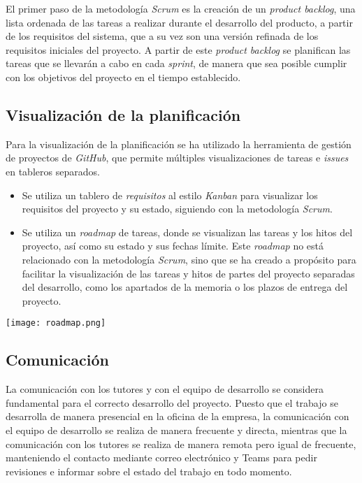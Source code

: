El primer paso de la metodología \textit{Scrum} es la creación de un \textit{product backlog},
una lista ordenada de las tareas a realizar durante el desarrollo del producto, a partir de los
requisitos del sistema, que a su vez son una versión refinada de los requisitos iniciales del
proyecto. A partir de este \textit{product backlog} se planifican las tareas que se llevarán
a cabo en cada \textit{sprint}, de manera que sea posible cumplir con los objetivos del proyecto
en el tiempo establecido.

\subsection{Visualización de la planificación}\label{subsec:visual_planif}
Para la visualización de la planificación se ha utilizado la herramienta de gestión de proyectos
de \textit{GitHub}, que permite múltiples visualizaciones de tareas e \textit{issues} en tableros
separados.

\begin{itemize}
	\item Se utiliza un tablero de \textit{requisitos} al estilo \textit{Kanban} para visualizar
		los requisitos del proyecto y su estado, siguiendo con la metodología \textit{Scrum}.
	\item Se utiliza un \textit{roadmap} de tareas, donde se visualizan las tareas y los hitos
		del proyecto, así como su estado y sus fechas límite. Este \textit{roadmap} no está
		relacionado con la metodología \textit{Scrum}, sino que se ha creado a propósito para
		facilitar la visualización de las tareas y hitos de partes del proyecto separadas del
		desarrollo, como los apartados de la memoria o los plazos de entrega del proyecto.
\end{itemize}

\begin{minipage}{0.9\linewidth}
	\centering
	\texttt{[image: roadmap.png]}
\end{minipage}

\subsection{Comunicación}\label{subsec:comunicación}
La comunicación con los tutores y con el equipo de desarrollo se considera fundamental para el
correcto desarrollo del proyecto. Puesto que el trabajo se desarrolla de manera presencial en
la oficina de la empresa, la comunicación con el equipo de desarrollo se realiza de manera
frecuente y directa, mientras que la comunicación con los tutores se realiza de manera remota
pero igual de frecuente, manteniendo el contacto mediante correo electrónico y Teams para
pedir revisiones e informar sobre el estado del trabajo en todo momento.

